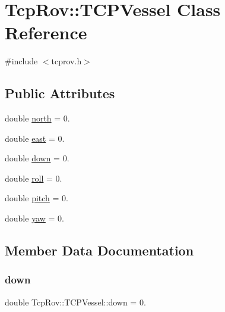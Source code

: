\hypertarget{class_tcp_rov_1_1_t_c_p_vessel}{}\section{Tcp\+Rov\+:\+:T\+C\+P\+Vessel Class Reference}
\label{class_tcp_rov_1_1_t_c_p_vessel}


{\ttfamily \#include $<$tcprov.\+h$>$}

\subsection*{Public Attributes}
\begin{DoxyCompactItemize}
\item 
double \mbox{\hyperlink{class_tcp_rov_1_1_t_c_p_vessel_abd1d2309d96d7e2789b5e94b93277704}{north}} = 0.
\item 
double \mbox{\hyperlink{class_tcp_rov_1_1_t_c_p_vessel_a6f9ebf4fd1c30bfd383a764d9f617073}{east}} = 0.
\item 
double \mbox{\hyperlink{class_tcp_rov_1_1_t_c_p_vessel_ab260263d14ce43d10155608a0ce933ac}{down}} = 0.
\item 
double \mbox{\hyperlink{class_tcp_rov_1_1_t_c_p_vessel_ab7de37679898d995e4d1ceb958a79019}{roll}} = 0.
\item 
double \mbox{\hyperlink{class_tcp_rov_1_1_t_c_p_vessel_a3467cfa5fb76206fb09eb9799a60370c}{pitch}} = 0.
\item 
double \mbox{\hyperlink{class_tcp_rov_1_1_t_c_p_vessel_ac522f6862ec60b3dc8afa781c741baa2}{yaw}} = 0.
\end{DoxyCompactItemize}


\subsection{Member Data Documentation}
\mbox{\label{class_tcp_rov_1_1_t_c_p_vessel_ab260263d14ce43d10155608a0ce933ac}} 
\subsubsection{\texorpdfstring{down}{down}}
{\footnotesize\ttfamily double Tcp\+Rov\+::\+T\+C\+P\+Vessel\+::down = 0.}


